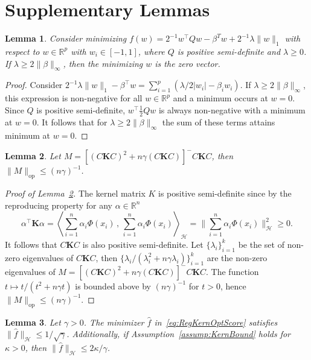 \documentclass[twoside, onecolumn]{article}
\def\R{\mathbb{R}}
\def\Hcal{\mathcal{H}}
\def\Hcal{\mathcal{H}}
\newtheorem{lemma}{Lemma}
\begin{document}
\section{Supplementary Lemmas}\label{sec:ProofOfLemmas}

\begin{lemma}\label{lem:lambdamax}
Consider minimizing
$f(w) = 2^{-1}w^{\top} Q w-\beta^Tw +2^{-1}\lambda\|w\|_{1}$ with respect to $w\in \R^p$ with $w_i\in[-1,1]$, where $Q$ is positive semi-definite and $\lambda\geq 0$. If $\lambda\geq 2\|\beta\|_\infty$, then the minimizing $w$ is the zero vector.
\end{lemma}

\begin{proof}
Consider $2^{-1}\lambda\|w\|_{1}-\beta^{\top}w=\sum_{i=1}^{p} (\lambda/2|w_i|-\beta_i w_i).$ If $\lambda \geq 2\|\beta\|_\infty$, this expression is non-negative for all $w\in \mathbb{R}^{p}$ and a minimum occurs at $w=0$. Since $Q$ is positive semi-definite, $w^{\top} \frac{1}{2} Q w$ is always non-negative with a minimum at $w=0$. It follows that for $\lambda \geq 2\|\beta\|_\infty$ the sum of these terms attains minimum at $w=0$.
\end{proof}

\begin{lemma}\label{lem:OpNormBound}
Let $M = [(C\mathbf{K}C)^2+n\gamma (C\mathbf{K}C)]^{-}C\mathbf{K}C$, then $\|M\|_{\text{op}}\leq (n\gamma)^{-1}$. 
\end{lemma}
\begin{proof}[Proof of Lemma~\ref{lem:OpNormBound}]
The kernel matrix $K$ is positive semi-definite since by the reproducing property for any $\alpha \in \R^n$ 
$$
\alpha^{\top}\mathbf{K}\alpha=\left<\sum_{i=1}^{n} \alpha_{i}\Phi(x_i)\,,\, \sum_{i=1}^{n}\alpha_{i}\Phi(x_i)\right>_\Hcal=\Big\|\sum_{i=1}^{n} \alpha_{i}\Phi(x_i)\Big\|^{2}_\Hcal\geq 0.
$$
It follows that $C\mathbf{K}C$ is also positive semi-definite. Let $\{\lambda_{i}\}_{i=1}^{k}$ be the set of non-zero eigenvalues of $C\mathbf{K}C$, then 
$\{\lambda_{i}/(\lambda_{i}^{2}+n\gamma \lambda_{i})\}_{i=1}^{k}$ are the non-zero eigenvalues of $M=[(C\mathbf{K}C)^2+n\gamma (C\mathbf{K}C)]^{-}C\mathbf{K}C$. The function $t\mapsto t/(t^2+n\gamma t)$ is bounded above by $(n\gamma)^{-1}$ for $t>0$, hence $\|M\|_{\text{op}}\leq (n\gamma)^{-1}$.
\end{proof}

\begin{lemma}\label{lem:Bounds} Let $\gamma >0$. The minimizer $\widehat f$ in~\eqref{eq:RegKernOptScore} satisfies $\|\widehat{f}\|_{\mathcal{H}}\leq 1/\sqrt{\gamma}$. Additionally, if Assumption~\ref{assump:KernBound} holds for $\kappa >0$, then $\|\widehat{f}\|_{\mathcal{H}}\leq 2\kappa/\gamma$.
\end{lemma}
\end{document}

